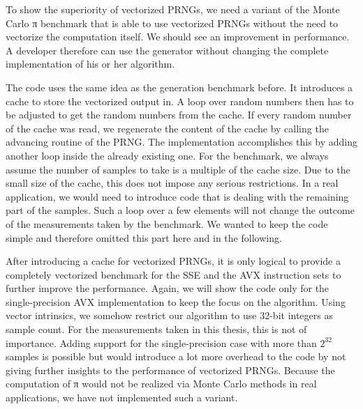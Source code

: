 \documentclass{stdlocal}
\begin{document}
    To show the superiority of vectorized PRNGs, we need a variant of the Monte Carlo π benchmark that is able to use vectorized PRNGs without the need to vectorize the computation itself.
    We should see an improvement in performance.
    A developer therefore can use the generator without changing the complete implementation of his or her algorithm.

    The code uses the same idea as the generation benchmark before.
    It introduces a cache to store the vectorized output in.
    A loop over random numbers then has to be adjusted to get the random numbers from the cache.
    If every random number of the cache was read, we regenerate the content of the cache by calling the advancing routine of the PRNG.
    The implementation accomplishes this by adding another  loop inside the already existing one.
    For the benchmark, we always assume the number of samples to take is a multiple of the cache size.
    Due to the small size of the cache, this does not impose any serious restrictions.
    In a real application, we would need to introduce code that is dealing with the remaining part of the samples.
    Such a loop over a few elements will not change the outcome of the measurements taken by the benchmark.
    We wanted to keep the code simple and therefore omitted this part here and in the following.

    After introducing a cache for vectorized PRNGs, it is only logical to provide a completely vectorized benchmark for the SSE and the AVX instruction sets to further improve the performance.
    Again, we will show the code only for the single-precision AVX implementation to keep the focus on the algorithm.
    Using vector intrinsics, we somehow restrict our algorithm to use 32-bit integers as sample count.
    For the measurements taken in this thesis, this is not of importance.
    Adding support for the single-precision case with more than $2^{32}$ samples is possible but would introduce a lot more overhead to the code by not giving further insights to the performance of vectorized PRNGs.
    Because the computation of π would not be realized via Monte Carlo methods in real applications, we have not implemented such a variant.
\end{document}
